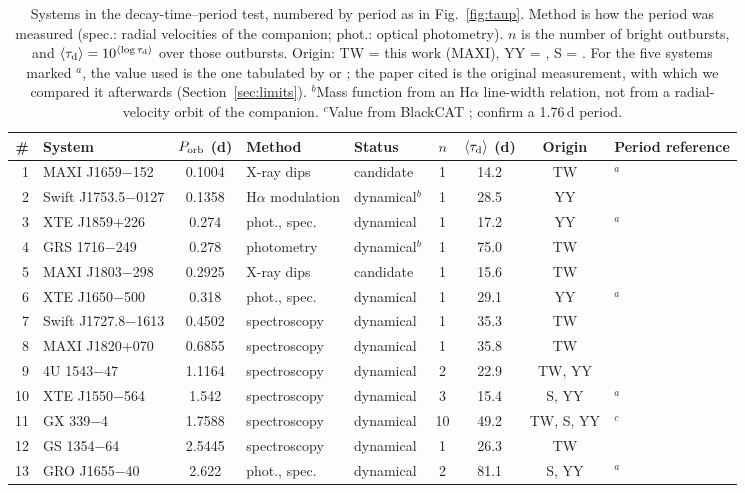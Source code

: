\documentclass[fleqn,usenatbib]{mnras}
\newcommand{\taud}{\tau_{\rm d}}
\newcommand{\porb}{P_{\rm orb}}
\begin{document}
\begin{table}
\centering
\caption{Systems in the decay-time--period test, numbered by period as in Fig.~\ref{fig:taup}. Method is how the period was measured (spec.: radial velocities of the companion; phot.: optical photometry). $n$ is the number of bright outbursts, and $\langle\taud\rangle=10^{\langle\log\taud\rangle}$ over those outbursts. Origin: TW = this work (MAXI), YY = \citet{YanYu2015}, S = \citet{Saraswati2025}. For the five systems marked $^{a}$, the value used is the one tabulated by \citet{YanYu2015} or \citet{Saraswati2025}; the paper cited is the original measurement, with which we compared it afterwards (Section~\ref{sec:limits}). $^{b}$Mass function from an H$\alpha$ line-width relation, not from a radial-velocity orbit of the companion. $^{c}$Value from BlackCAT \citep{CorralSantana2016}; \citet{Heida2017} confirm a 1.76\,d period.}
\label{tab:sample}
\begin{tabular}{rlcllcccl}
\toprule
\# & System & $\porb$ (d) & Method & Status & $n$ & $\langle\taud\rangle$ (d) & Origin & Period reference \\
\midrule
1 & MAXI J1659$-$152   & 0.1004 & X-ray dips & candidate & 1 & 14.2 & TW & \citet{Kuulkers2013}$^{a}$ \\
2 & Swift J1753.5$-$0127 & 0.1358 & H$\alpha$ modulation & dynamical$^{b}$ & 1 & 28.5 & YY & \citet{YanesRizo2025} \\
3 & XTE J1859+226      & 0.274 & phot., spec. & dynamical & 1 & 17.2 & YY & \citet{CorralSantana2011}$^{a}$ \\
4 & GRS 1716$-$249     & 0.278 & photometry & dynamical$^{b}$ & 1 & 75.0 & TW & \citet{Casares2023} \\
5 & MAXI J1803$-$298   & 0.2925 & X-ray dips & candidate & 1 & 15.6 & TW & \citet{Jana2022} \\
6 & XTE J1650$-$500    & 0.318 & phot., spec. & dynamical & 1 & 29.1 & YY & \citet{Orosz2004}$^{a}$ \\
7 & Swift J1727.8$-$1613 & 0.4502 & spectroscopy & dynamical & 1 & 35.3 & TW & \citet{MataSanchez2025} \\
8 & MAXI J1820+070     & 0.6855 & spectroscopy & dynamical & 1 & 35.8 & TW & \citet{Torres2019} \\
9 & 4U 1543$-$47       & 1.1164 & spectroscopy & dynamical & 2 & 22.9 & TW, YY & \citet{Orosz1998,Orosz2003} \\
10 & XTE J1550$-$564   & 1.542 & spectroscopy & dynamical & 3 & 15.4 & S, YY & \citet{Orosz2011}$^{a}$ \\
11 & GX 339$-$4        & 1.7588 & spectroscopy & dynamical & 10 & 49.2 & TW, S, YY & \citet{Heida2017}$^{c}$ \\
12 & GS 1354$-$64      & 2.5445 & spectroscopy & dynamical & 1 & 26.3 & TW & \citet{Casares2009} \\
13 & GRO J1655$-$40    & 2.622 & phot., spec. & dynamical & 2 & 81.1 & S, YY & \citet{Greene2001}$^{a}$ \\
\bottomrule
\end{tabular}
\end{table}
\end{document}
